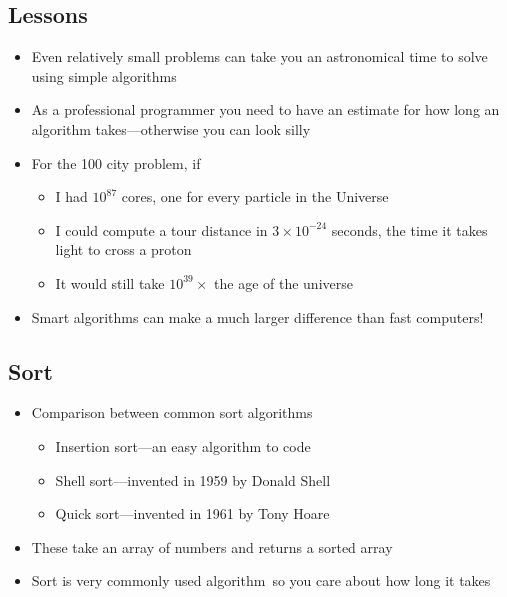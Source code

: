 
\begin{slide}
\section{Lessons}
\vspace{-1cm}
\begin{itemize}
\item Even relatively small problems can take you an astronomical
  time to solve using simple algorithms\pause
\item As a professional programmer you need to have an estimate for
  how long an algorithm takes\pause---otherwise you can look silly\pause
\item For the 100 city problem, if 
  \begin{itemize}
  \item I had $10^{87}$ cores\pause, one for every particle in
    the Universe\pause
  \item I could compute a tour distance in $3\times10^{-24}$ seconds\pause,
    the time it takes light to cross a proton\pause
  \item It would still take $10^{39}\times$ the age of the universe\pause
  \end{itemize}
\item Smart algorithms can make a much larger difference than fast
  computers!\pause
\end{itemize}


\end{slide}


\Outline


\begin{slide}
\section{Sort}

\begin{itemize}
\item Comparison between common sort algorithms
  \begin{itemize}
  \item Insertion sort---an easy algorithm to code
  \item Shell sort---invented in 1959 by Donald Shell
  \item Quick sort---invented in 1961 by Tony Hoare
  \end{itemize}\pause
\item These take an array of numbers and returns a sorted array\pause
\item Sort is very commonly used algorithm\pause\ so you care about how
  long it takes\pause
\end{itemize}
\end{slide}

